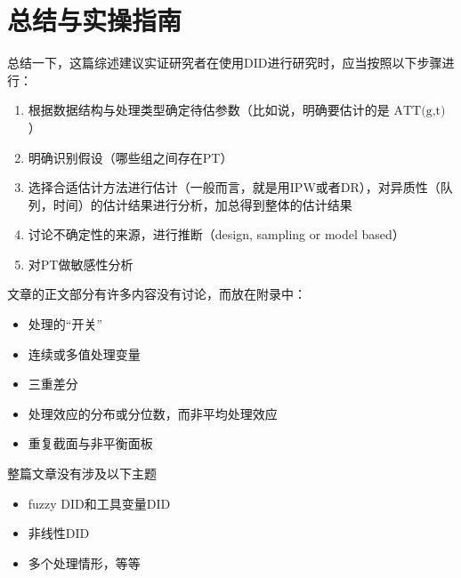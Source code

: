 \documentclass[../didNotes.tex]{subfiles}
\begin{document}

\section{总结与实操指南}

总结一下，这篇综述建议实证研究者在使用DID进行研究时，应当按照以下步骤进行：
\begin{enumerate}
  \item 根据数据结构与处理类型确定待估参数（比如说，明确要估计的是 $\text{ATT(g,t)}$）
  \item 明确识别假设（哪些组之间存在PT）
  \item 选择合适估计方法进行估计（一般而言，就是用IPW或者DR），对异质性（队列，时间）的估计结果进行分析，加总得到整体的估计结果
  \item 讨论不确定性的来源，进行推断（design, sampling or model based）
  \item 对PT做敏感性分析
\end{enumerate}
文章的正文部分有许多内容没有讨论，而放在附录中：
\begin{itemize}
  \item 处理的``开关''
  \item 连续或多值处理变量
  \item 三重差分
  \item 处理效应的分布或分位数，而非平均处理效应
  \item 重复截面与非平衡面板
\end{itemize}
整篇文章没有涉及以下主题
\begin{itemize}
  \item fuzzy DID和工具变量DID
  \item 非线性DID
  \item 多个处理情形，等等
\end{itemize}
\end{document}
